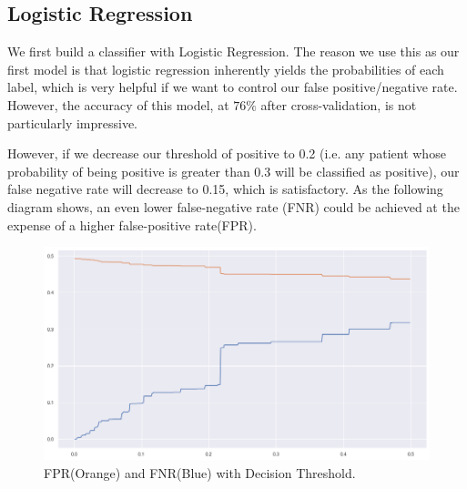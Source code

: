 \documentclass[a4paper, 11pt]{article}
\begin{document}
\subsection*{Logistic Regression}
We first build a classifier with Logistic Regression. The reason we use this as our first model is that logistic regression inherently yields the probabilities of each label, which is very helpful if we want to control our false positive/negative rate. However, the accuracy of this model, at $76\%$ after cross-validation, is not particularly impressive.\par
However, if we decrease our threshold of positive to 0.2 (i.e. any patient whose probability of being positive is greater than 0.3 will be classified as positive), our false negative rate will decrease to 0.15, which is satisfactory. As the following diagram shows, an even lower false-negative rate (FNR) could be achieved at the expense of a higher false-positive rate(FPR).\par
\begin{figure}[H]
\centering
\includegraphics[scale=0.4]{fps.png}
\caption{FPR(Orange) and FNR(Blue) with Decision Threshold.}
\label{Confirmed Cases}
\end{figure}
\end{document}
